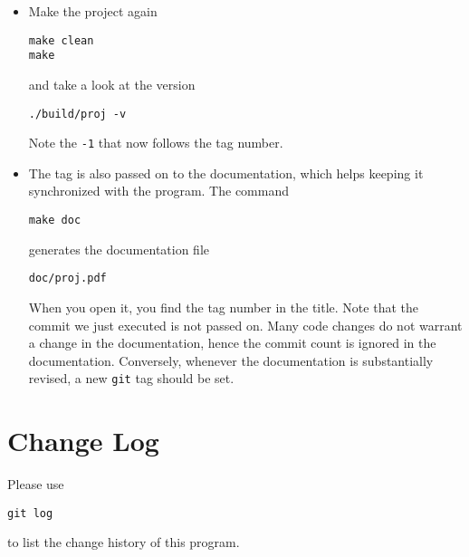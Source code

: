 \documentclass[a4paper, english]{article}
\begin{document}
\begin{itemize}
and change the line
\begin{verbatim}
printf("Test output.\n");
\end{verbatim}
to, say,
\begin{verbatim}
printf("Test out.\n");
\end{verbatim}
Add the change to the \texttt{git} repository and commit it
\begin{verbatim}
git add src/proj.c 
git commit -m "Test commit"
\end{verbatim}
\item Make the project again
\begin{verbatim}
make clean
make
\end{verbatim}
and take a look at the version
\begin{verbatim}
./build/proj -v
\end{verbatim}
Note the \texttt{-1} that now follows the tag number.
\item The tag is also passed on to the documentation, which helps
  keeping it synchronized with the program. The command
\begin{verbatim}
make doc
\end{verbatim}
generates the documentation file
\begin{verbatim}
doc/proj.pdf
\end{verbatim}
When you open it, you find the tag number in the title. Note that the
commit we just executed is not passed on. Many code changes do not
warrant a change in the documentation, hence the commit count is
ignored in the documentation. Conversely, whenever the documentation
is substantially revised, a new \texttt{git} tag should be set.
\end{itemize}

\section{Change Log}
Please use
\begin{verbatim}
git log
\end{verbatim}
to list the change history of this program.

\end{document}
